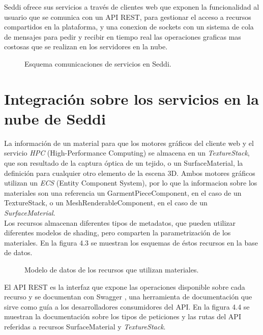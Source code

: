     Seddi ofrece sus servicios a trav\'es de clientes web que exponen la funcionalidad al usuario que se comunica con un API
    REST, para gestionar el acceso a recursos compartidos en la plataforma, y una conexion de sockets con un sistema de cola de
    mensajes para pedir y recibir en tiempo real las operaciones graficas mas costosas que se realizan en los servidores en la nube.

    \begin{figure}[H]
      \vspace{1cm}
      \centering
      \caption{Esquema comunicaciones de servicios en Seddi.}
      \vspace{1.5cm}
    \end{figure}

  \egroup

  \section{Integraci\'on sobre los servicios en la nube de Seddi}
  La informaci\'on de un material para que los motores gr\'aficos del cliente web y el servicio \textit{HPC} (High-Performance Computing)
  se almacena en un \textit{TextureStack}, que son resultado de la captura \'optica de un tejido, o un SurfaceMaterial, la definici\'on para
  cualquier otro elemento de la escena 3D. Ambos motores gr\'aficos utilizan un \textit{ECS} (Entity Component System), por lo que
  la informacion sobre los materiales son una referencia un GarmentPieceComponent, en el caso de un TextureStack,
  o un MeshRenderableComponent, en el caso de un \textit{SurfaceMaterial}.\\
  Los recursos almacenan diferentes tipos de metadatos, que pueden utilizar diferentes modelos de shading, pero
  comparten la parametrizaci\'on de los materiales. En la figura 4.3 se muestran los esquemas de \'estos recursos en la
  base de datos.\\

  \begin{figure}[H]
    \vspace{0.5cm}
    \centering
    \caption{Modelo de datos de los recursos que utilizan materiales.}
    \vspace{0.5cm}
  \end{figure}
  

  El API REST es la interfaz que expone las operaciones disponible sobre cada recurso y se documentan con Swagger \autocite{swagger},
  una herramienta de documentaci\'on que sirve como gu\'ia a los desarrolladores consumidores del API. En
  la figura 4.4 se muestran la documentaci\'on sobre los tipos de peticiones y las rutas del API referidas a recursos
  SurfaceMaterial y \textit{TextureStack}.\\
  
